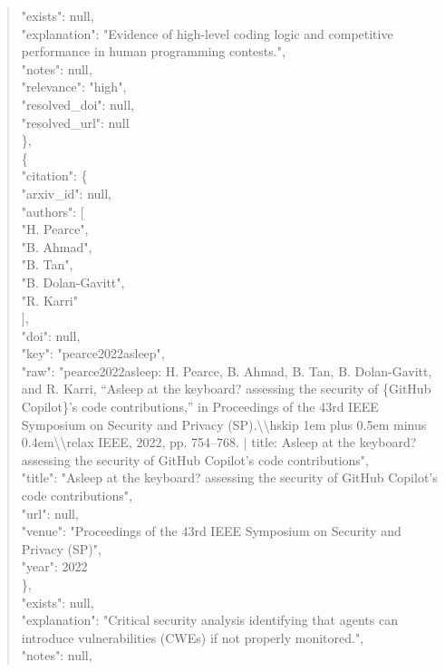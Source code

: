 \documentclass[11pt]{article}
\begin{document}
\begin{quote}
      "exists": null,\\
      "explanation": "Evidence of high-level coding logic and competitive performance in human programming contests.",\\
      "notes": null,\\
      "relevance": "high",\\
      "resolved\_doi": null,\\
      "resolved\_url": null\\
    \},\\
    \{\\
      "citation": \{\\
        "arxiv\_id": null,\\
        "authors": [\\
          "H. Pearce",\\
          "B. Ahmad",\\
          "B. Tan",\\
          "B. Dolan-Gavitt",\\
          "R. Karri"\\
        ],\\
        "doi": null,\\
        "key": "pearce2022asleep",\\
        "raw": "pearce2022asleep: H. Pearce, B. Ahmad, B. Tan, B. Dolan-Gavitt, and R. Karri, ``Asleep at the keyboard? assessing the security of \{GitHub Copilot\}'s code contributions,'' in Proceedings of the 43rd IEEE Symposium on Security and Privacy (SP).\textbackslash{}\textbackslash{}hskip 1em plus 0.5em minus 0.4em\textbackslash{}\textbackslash{}relax IEEE, 2022, pp. 754--768. | title: Asleep at the keyboard? assessing the security of GitHub Copilot's code contributions",\\
        "title": "Asleep at the keyboard? assessing the security of GitHub Copilot's code contributions",\\
        "url": null,\\
        "venue": "Proceedings of the 43rd IEEE Symposium on Security and Privacy (SP)",\\
        "year": 2022\\
      \},\\
      "exists": null,\\
      "explanation": "Critical security analysis identifying that agents can introduce vulnerabilities (CWEs) if not properly monitored.",\\
      "notes": null,\\

\end{quote}
\end{document}
